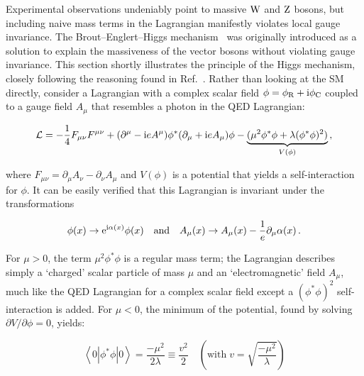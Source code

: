 Experimental observations undeniably point to massive $\mathrm{W}$ and $\mathrm{Z}$ bosons, but including naive mass terms in the Lagrangian manifestly violates local gauge invariance.
% 
The Brout--Englert--Higgs mechanism~\cite{Higgs:1964pj,Englert:1964et,Guralnik:1964eu} was originally introduced as a solution to explain the massiveness of the vector bosons without violating gauge invariance.
% 
This section shortly illustrates the principle of the Higgs mechanism, closely following the reasoning found in Ref.~\cite{Djouadi:2005gi}.
% 
Rather than looking at the SM directly, consider a Lagrangian with a complex scalar field $\phi = \phi_\mathrm{R} + \mathrm{i} \phi_\mathrm{C}$ coupled to a gauge field $A_\mu$ that resembles a photon in the QED Lagrangian:
% 
\begin{linenomath*}
\begin{equation}
\label{eq:lagrangian-higgs}
\mathcal{L} =
    -\frac{1}{4} F_{\mu\nu} F^{\mu\nu}
    + (\partial^\mu - \mathrm{i} e A^\mu) \phi^\ast (\partial_\mu + \mathrm{i} e A_\mu) \phi
    - \underbrace{(\mu^2 \phi^\ast \phi + \lambda (\phi^\ast \phi)^2)}_{V(\phi)}
\,,
\end{equation}
\end{linenomath*}
% 
where $F_{\mu\nu} = \partial_\mu A_\nu - \partial_\nu A_\mu$ and $V(\phi)$ is a potential that yields a self-interaction for $\phi$.
% 
It can be easily verified that this Lagrangian is invariant under the transformations
% 
\begin{linenomath*}
\begin{equation}
\label{eq:transformations-higgs}
\phi(x) \to \mathrm{e}^{\mathrm{i} \alpha(x)} \phi(x)
\quad \text{and} \quad 
A_\mu(x) \to A_\mu(x) - \frac{1}{e} \partial_\mu \alpha(x)
\,.
\end{equation}
\end{linenomath*}
% 
For $\mu > 0$, the term $\mu^2 \phi^\ast \phi$ is a regular mass term; the Lagrangian describes simply a `charged' scalar particle of mass $\mu$ and an `electromagnetic' field $A_\mu$, much like the QED Lagrangian for a complex scalar field except a $(\phi^\ast\phi)^2$ self-interaction is added.
% 
For $\mu < 0$, the minimum of the potential, found by solving $\partial V / \partial \phi = 0$, yields:
% 
\begin{linenomath*}
\begin{equation}
\left< 0 | \phi^\ast\phi | 0 \right> = \frac{-\mu^2}{2\lambda}  \equiv  \frac{v^2}{2}
\quad \left( \text{with} \; v = \sqrt{\frac{-\mu^2}{\lambda}} \right)
\end{equation}
\end{linenomath*}
